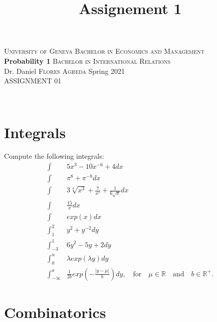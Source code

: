 \documentclass[12pt,a4paper,titlepage]{article}\usepackage[]{graphicx}\usepackage[]{color}
\title{Assignement 1}
\begin{document}
\noindent \textsc{University of Geneva}     \hfill \textsc{Bachelor in Economics and Management} \\
\textbf{Probability 1}                      \hfill \textsc{Bachelor in International Relations} \\
Dr. Daniel \textsc{Flores Agreda}                 \hfill Spring 2021  \\
ASSIGNMENT 01                               \hfill



\noindent
\makebox[\linewidth]{\rule{\textwidth}{0.4pt}}\\[1.5ex]





\section{Integrals}


Compute the following integrals: \\
\begin{align*}
\int& 5x^{3}-10x^{-6}+4 dx \\
\int&  \pi^{8}+\pi^{-8} dx \\
\int& 3\sqrt[4]{x^{3}}+\frac{7}{x^{5}}+\frac{1}{6\sqrt{x}}dx \\
\int& \frac{15}{x}dx \\
\int & exp(x)dx\\
\int_{1}^{2}& y^{2}+y^{-2}dy \\
\int_{-3}^{1}& 6y^{2}-5y+2dy \\
\int_{0}^{u}& \lambda exp(\lambda y) dy \\
\int_{-\infty}^{a}& \frac{1}{2b} exp\left (-\frac{|y-\mu|}{b}\right) dy, \quad \text{for} \quad \mu \in \mathbb{R} \quad \text{and} \quad b \in \mathbb{R}^{+}.
\end{align*}


\vspace{1cm}


\section{Combinatorics}
\end{document}
